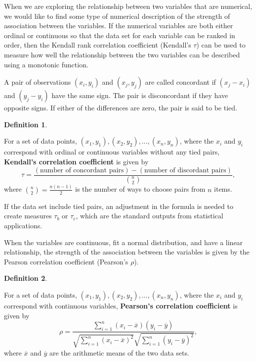 \documentclass[
]{book}
\theoremstyle{definition}
\newtheorem{definition}{Definition}[chapter]
\theoremstyle{definition}
\theoremstyle{definition}
\theoremstyle{definition}
\theoremstyle{remark}
\begin{document}
When we are exploring the relationship between two variables that are numerical, we would like to find some type of numerical description of the strength of association between the variables. If the numerical variables are both either ordinal or continuous so that the data set for each variable can be ranked in order, then the Kendall rank correlation coefficient (Kendall's \(\tau\)) can be used to measure how well the relationship between the two variables can be described using a monotonic function.

A pair of observations \((x_i,y_i)\) and \((x_j,y_j)\) are called concordant if \((x_j-x_i)\) and \((y_j-y_i)\) have the same sign. The pair is disconcordant if they have opposite signs. If either of the differences are zero, the pair is said to be tied.

\begin{definition}
\protect\hypertarget{def:unlabeled-div-302}{}\label{def:unlabeled-div-302}

For a set of data points, \((x_1, y_1), (x_2, y_2), \ldots, (x_n,y_n)\), where the \(x_i\) and \(y_i\) correspond with ordinal or continuous variables without any tied pairs, \textbf{Kendall's correlation coefficient} is given by
\[\tau = \frac{(\mbox{number of concordant pairs})- (\mbox{number of discordant pairs})}{\binom{n}{2}},\]
where \(\binom{n}{2}=\frac{n(n-1)}{2}\) is the number of ways to choose pairs from \(n\) items.

\end{definition}

If the data set include tied pairs, an adjustment in the formula is needed to create measures \(\tau_b\) or \(\tau_c\), which are the standard outputs from statistical applications.

When the variables are continuous, fit a normal distribution, and have a linear relationship, the strength of the association between the variables is given by the Pearson correlation coefficient (Pearson's \(\rho\)).

\begin{definition}
\protect\hypertarget{def:unlabeled-div-303}{}\label{def:unlabeled-div-303}

For a set of data points, \((x_1, y_1), (x_2, y_2), \ldots, (x_n,y_n)\), where the \(x_i\) and \(y_i\) correspond with continuous variables, \textbf{Pearson's correlation coefficient} is given by
\[\rho = \frac{ \sum_{i=1}^n (x_i-\overline{x})(y_i-\overline{y})}{\sqrt{\sum_{i=1}^n (x_i-\overline{x})^2} \sqrt{\sum_{i=1}^n (y_i-\overline{y})^2}},\] where \(\overline{x}\) and \(\overline{y}\) are the arithmetic means of the two data sets.

\end{definition}
\end{document}
